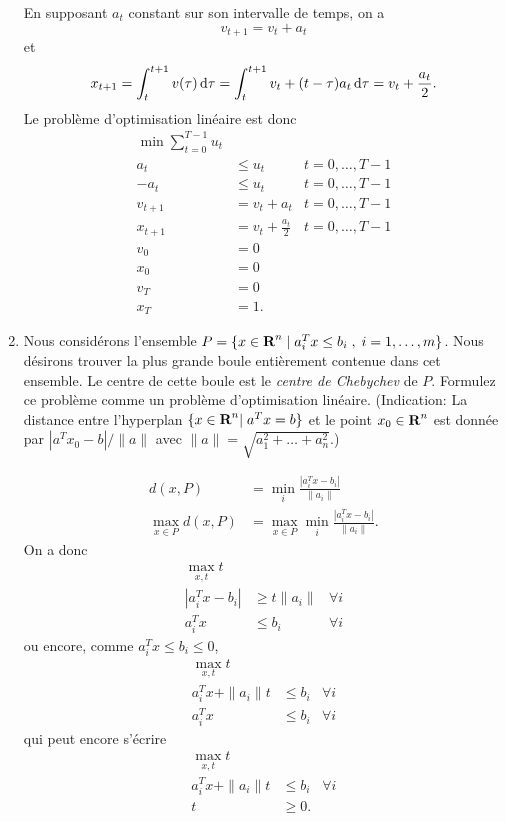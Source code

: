 \begin{enumerate}
    \begin{solution}
      En supposant $a_t$ constant sur son intervalle de temps, on a
      \[ v_{t+1} = v_t + a_t \]
      et
      \[ x_{t+1} = \int_t^{t+1} v(\tau) \operatorname{d}\! \tau
      = \int_t^{t+1} v_t + (t-\tau)a_t \operatorname{d}\! \tau
      = v_t + \frac{a_t}{2}. \]
      Le problème d'optimisation linéaire est donc
      \begin{align*}
        \min \sum_{t=0}^{T-1} u_t\\
        a_t & \leq u_t & t = 0,\ldots,T-1\\
        -a_t & \leq u_t & t = 0,\ldots,T-1\\
        v_{t+1} & = v_t + a_t & t = 0,\ldots,T-1\\
        x_{t+1} & = v_t + \frac{a_t}{2} & t = 0,\ldots,T-1\\
        v_0 & = 0\\
        x_0 & = 0\\
        v_T & = 0\\
        x_T & = 1.
      \end{align*}
    \end{solution}



  \item Nous considérons l'ensemble $P=\{ x \in {\mbox{\bf R}}^n \; | \; a_i^T x \leq b_i \; , \;  i=1, \ldots, m \}$. Nous désirons trouver la
    plus grande boule entièrement contenue dans cet ensemble. Le centre de cette boule est  le {\it centre de Chebychev} de $P$.  Formulez
    ce problème comme un problème d'optimisation linéaire. (Indication:  La distance entre l'hyperplan $\{x \in {\mbox{\bf R}}^n | \;  a^Tx=b \}$ et le point $x_0 \in {\mbox{\bf R}}^n$
    est donnée par
    $|a^Tx_0 - b|/\|a\|$ avec $\|a\|=\sqrt{a_1^2+ \ldots + a_n^2}$.)

    \begin{solution}
      \begin{align*}
        d(x, P) & = \min_i \frac{|a_i^Tx - b_i|}{\|a_i\|}\\
        \max_{x\in P} d(x, P)
        & = \max_{x\in P}\min_i \frac{|a_i^Tx - b_i|}{\|a_i\|}.
      \end{align*}
      On a donc
      \begin{align*}
        \max_{x, t} t\\
        |a_i^Tx - b_i| & \geq t\|a_i\| & \forall i\\
        a_i^Tx & \leq b_i & \forall i
      \end{align*}
      ou encore, comme $a_i^Tx \leq b_i \leq 0$,
      \begin{align*}
        \max_{x, t} t\\
        a_i^Tx + \|a_i\|t & \leq b_i & \forall i\\
        a_i^Tx & \leq b_i & \forall i
      \end{align*}
      qui peut encore s'écrire
      \begin{align*}
        \max_{x, t} t\\
        a_i^Tx + \|a_i\|t & \leq b_i & \forall i\\
        t & \geq 0.
      \end{align*}
    \end{solution}



\end{enumerate}
